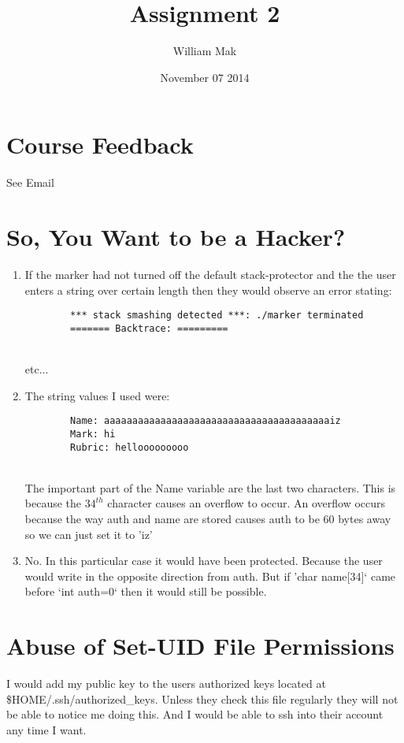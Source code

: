 \documentclass{article}
\title{Assignment 2}
\author{William Mak}
\date{November 07 2014}
\begin{document}
\maketitle

\section{Course Feedback}
See Email

\section{So, You Want to be a Hacker?}
\begin{enumerate}[A]
	\item
		If the marker had not turned off the default stack-protector and the the
		user enters a string over certain length then they would observe an
		error stating:
		\begin{verbatim}
		*** stack smashing detected ***: ./marker terminated
		======= Backtrace: =========
		\end{verbatim}\\
		etc...
	\item
		The string values I used were:
		\begin{verbatim}
		Name: aaaaaaaaaaaaaaaaaaaaaaaaaaaaaaaaaaaaaaaaiz
		Mark: hi
		Rubric: hellooooooooo
		\end{verbatim}\\
		The important part of the Name variable are the last two characters.
		This is because the $34^{th}$ character causes an overflow to occur. An
		overflow occurs because the way auth and name are stored causes auth to 
		be 60 bytes away so we can just set it to 'iz'
	\item
		No. In this particular case it would have been protected. Because the
		user would write in the opposite direction from auth. But if 
		'char name[34]` came before `int auth=0` then it would still be 
		possible.
\end{enumerate}

\section{Abuse of Set-UID File Permissions}
I would add my public key to the users authorized keys located at
\$HOME/.ssh/authorized\_keys. Unless they check this file regularly they will
not be able to notice me doing this. And I would be able to ssh into their
account any time I want.
\end{document}
